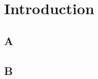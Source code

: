 \chapter{Introduction} %

\label{Chapter1} %
\setcounter{chapter}{1}

\newcommand{\keyword}[1]{\textbf{#1}}
\newcommand{\tabhead}[1]{\textbf{#1}}
\newcommand{\code}[1]{\texttt{#1}}
\newcommand{\file}[1]{\texttt{\bfseries#1}}
\newcommand{\option}[1]{\texttt{\itshape#1}}
\section{A}
\cite{Saleh:JCP155:144109}
\section{B}
